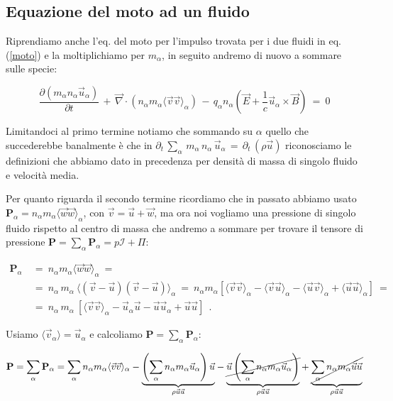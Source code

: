 %
%
\vspace{0.5cm}
\subsection{Equazione del moto ad un fluido}

Riprendiamo anche l'eq. del moto per l'impulso trovata per i due fluidi in eq.(\ref{moto}) e la moltiplichiamo per $m_\alpha$, in seguito andremo di nuovo a sommare sulle specie:

\[\frac{\partial(m_\alpha n_\alpha \vec u_\alpha)}{\partial t}\, +\, \vec\nabla \cdot (n_\alpha m_\alpha \langle \vec v \vec v\rangle_\alpha)\, -\, q_\alpha n_\alpha (\vec E + \frac{1}{c}\vec u_\alpha\times \vec B)\ =\ 0\]

Limitandoci al primo termine notiamo che sommando su $\alpha$ quello che succederebbe banalmente è che in $\partial_t\, \sum_\alpha\, m_\alpha\, n_\alpha\, \vec u_\alpha\, =\, \partial_t\, (\rho \vec u)$ riconosciamo le definizioni che abbiamo dato in precedenza per densità di massa di singolo fluido e velocità media.

Per quanto riguarda il secondo termine ricordiamo che in passato abbiamo usato $\mathbf{P}_\alpha=n_\alpha m_\alpha \langle \vec w \vec w \rangle_\alpha$, con $\vec v = \vec u + \vec w$, ma ora noi vogliamo una pressione di singolo fluido rispetto al centro di massa che andremo a sommare per trovare il tensore di pressione $\mathbf{P} = \sum_\alpha \mathbf{P}_\alpha = p\mathcal{I} + \Pi$:

\[\begin{aligned}
	\mathbf{P}_\alpha\ 
	&=\ n_\alpha m_\alpha \langle \vec w \vec w \rangle_\alpha\ =\\ 
	&=\ n_\alpha\, m_\alpha\ \langle (\vec v - \vec u) (\vec v - \vec u) \rangle_\alpha\ =\ n_\alpha m_\alpha [\langle \vec v\vec v\rangle_\alpha - \langle \vec v\vec u\rangle_\alpha - \langle \vec u\vec v\rangle_\alpha + \langle \vec u\vec u\rangle_\alpha]\ = \\
	&=\ n_\alpha\, m_\alpha\ [\langle \vec v\vec v\rangle_\alpha - \vec u_\alpha\vec u - \vec u\vec u_\alpha + \vec u\vec u]\ \ .
\end{aligned}\]

Usiamo $\langle \vec v_\alpha\rangle = \vec u_\alpha$ e calcoliamo $\mathbf{P}=\sum_\alpha \mathbf{P}_\alpha$:

\[ \mathbf{P} = \sum_\alpha \mathbf{P}_\alpha = \sum_\alpha n_\alpha m_\alpha \langle \vec v\vec v\rangle_\alpha - \underset{\rho\vec u\vec u}{\underbrace{\left(\sum_\alpha n_\alpha m_\alpha \vec u_\alpha\right)\vec u}} - \underset{\rho\vec u\vec u}{\underbrace{\cancel{\vec u\left(\sum_\alpha n_\alpha m_\alpha \vec u_\alpha\right)}}} + \underset{\rho\vec u\vec u}{\underbrace{\cancel{\sum_\alpha n_\alpha m_\alpha  \vec u\vec u}}} \]


